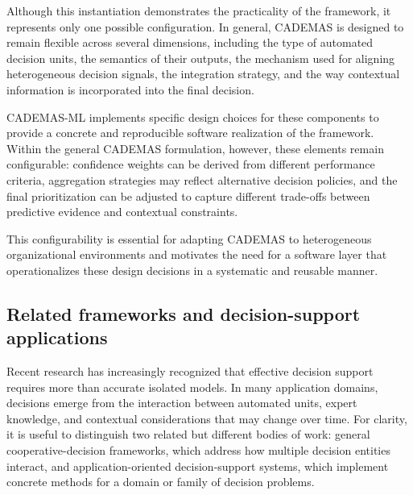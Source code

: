 \documentclass{interact}
\begin{document}
Although this instantiation demonstrates the practicality of the framework, it represents only one possible configuration. In general, CADEMAS is designed to remain flexible across several dimensions, including the type of automated decision units, the semantics of their outputs, the mechanism used for aligning heterogeneous decision signals, the integration strategy, and the way contextual information is incorporated into the final decision.

CADEMAS-ML implements specific design choices for these components to provide a concrete and reproducible software realization of the framework. Within the general CADEMAS formulation, however, these elements remain configurable: confidence weights can be derived from different performance criteria, aggregation strategies may reflect alternative decision policies, and the final prioritization can be adjusted to capture different trade-offs between predictive evidence and contextual constraints.

This configurability is essential for adapting CADEMAS to heterogeneous organizational environments and motivates the need for a software layer that operationalizes these design decisions in a systematic and reusable manner.

\subsection{Related frameworks and decision-support applications}\label{sec:related}

Recent research has increasingly recognized that effective decision support requires more than accurate isolated models. In many application domains, decisions emerge from the interaction between automated units, expert knowledge, and contextual considerations that may change over time. For clarity, it is useful to distinguish two related but different bodies of work: general cooperative-decision frameworks, which address how multiple decision entities interact, and application-oriented decision-support systems, which implement concrete methods for a domain or family of decision problems.
\end{document}
